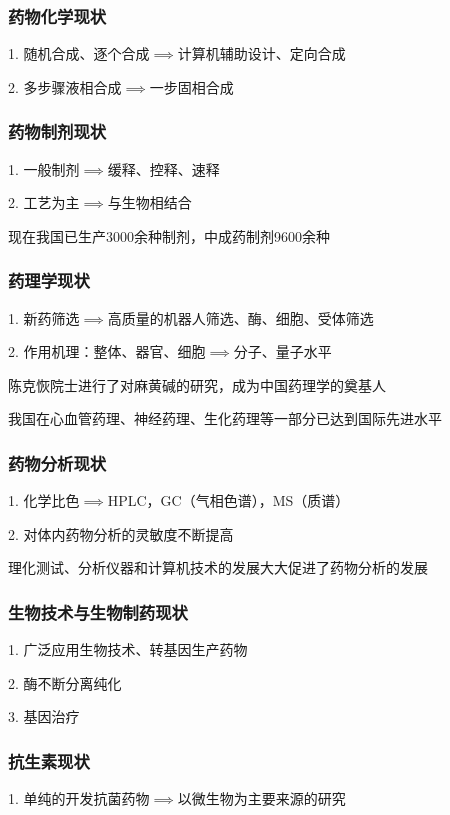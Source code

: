 \subsubsection*{药物化学现状}%
\label{subsub:药物化学现状}
1. 随机合成、逐个合成$\implies$计算机辅助设计、定向合成

2. 多步骤液相合成$\implies$一步固相合成

\subsubsection*{药物制剂现状}%
\label{subsub:药物制剂现状}
1. 一般制剂$\implies$缓释、控释、速释

2. 工艺为主$\implies$与生物相结合

\begin{notation}
    现在我国已生产3000余种制剂，中成药制剂9600余种
\end{notation}
\subsubsection*{药理学现状}%
\label{subsub:药理学现状}
1. 新药筛选$\implies$高质量的机器人筛选、酶、细胞、受体筛选

2. 作用机理：整体、器官、细胞$\implies$分子、量子水平

\begin{notation}
    陈克恢院士进行了对麻黄碱的研究，成为中国药理学的奠基人

    我国在心血管药理、神经药理、生化药理等一部分已达到国际先进水平
\end{notation}
\subsubsection*{药物分析现状}%
\label{subsub:药物分析现状}
1. 化学比色$\implies$HPLC，GC（气相色谱），MS（质谱）

2. 对体内药物分析的灵敏度不断提高
\begin{notation}
    理化测试、分析仪器和计算机技术的发展大大促进了药物分析的发展
\end{notation}
\subsubsection*{生物技术与生物制药现状}%
\label{subsub:生物技术与生物制药现状}
1. 广泛应用生物技术、转基因生产药物

2. 酶不断分离纯化

3. 基因治疗
\subsubsection*{抗生素现状}%
\label{subsub:抗生素现状}
1. 单纯的开发抗菌药物$\implies$以微生物为主要来源的研究

